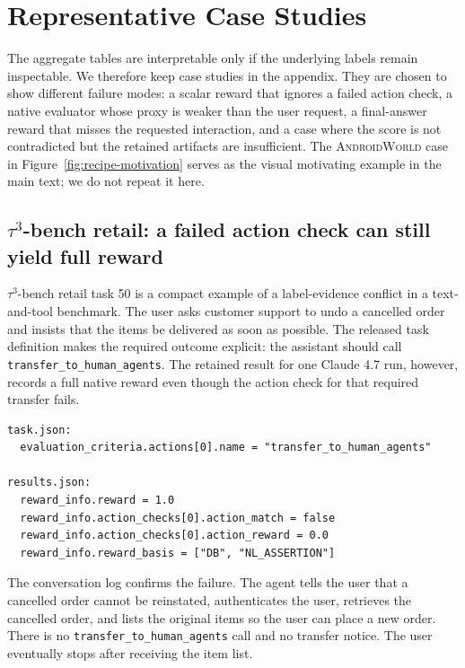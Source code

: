 \documentclass{article}
\newcommand{\androidworld}{\textsc{AndroidWorld}\xspace}
\begin{document}
\section{Representative Case Studies}
\label{app:representative-cases}

The aggregate tables are interpretable only if the underlying labels remain
inspectable. We therefore keep case studies in the appendix.
They are chosen to show different failure modes: a scalar reward that ignores a
failed action check, a native evaluator whose proxy is weaker than the user
request, a final-answer reward that misses the requested interaction, and a
case where the score is not contradicted but the retained artifacts are
insufficient. The \androidworld case in Figure~\ref{fig:recipe-motivation}
serves as the visual motivating example in the main text; we do not repeat it
here.

\subsection{\texorpdfstring{\(\tau^3\)-bench retail: a failed action check can still yield full reward}{tau3-bench retail: a failed action check can still yield full reward}}
\label{app:tau3-transfer-case}

\(\tau^3\)-bench retail task 50 is a compact example of a label-evidence
conflict in a text-and-tool benchmark. The user asks customer support to undo a
cancelled order and insists that the items be delivered as soon as possible.
The released task definition makes the required outcome explicit: the assistant
should call \texttt{transfer\_to\_human\_agents}. The retained result for one
Claude 4.7 run, however, records a full native reward even though the action
check for that required transfer fails.

\begin{lstlisting}
task.json:
  evaluation_criteria.actions[0].name = "transfer_to_human_agents"

results.json:
  reward_info.reward = 1.0
  reward_info.action_checks[0].action_match = false
  reward_info.action_checks[0].action_reward = 0.0
  reward_info.reward_basis = ["DB", "NL_ASSERTION"]
\end{lstlisting}

The conversation log confirms the failure. The agent tells the user that a
cancelled order cannot be reinstated, authenticates the user, retrieves the
cancelled order, and lists the original items so the user can place a new order.
There is no \texttt{transfer\_to\_human\_agents} call and no transfer notice.
The user eventually stops after receiving the item list.
\end{document}
